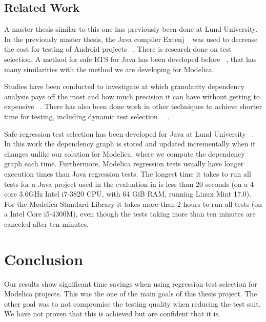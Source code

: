 \documentclass{cslthse-msc}
\begin{document}
\section{Related Work}
A master thesis similar to this one has previously been done at Lund University. In the previously master thesis, the Java compiler Extenj ~\cite{DBLP:conf/oopsla/EkmanH07} was used to decrease the cost for testing of Android projects ~\cite{kampe2012dependroid}. There is research done on test selection. A method for safe RTS for Java has been developed before ~\cite{DBLP:conf/pppj/OqvistHM16}, that has many similarities with the method we are developing for Modelica. 

Studies have been conducted to investigate at which granularity dependency analysis pays off the most and how much precision it can have without getting to expensive ~\cite{DBLP:conf/sigsoft/LegunsenHSLZM16}. There has also been done work in other techniques to achieve shorter time for testing, including dynamic test selection ~\cite{DBLP:journals/tse/RothermelH96}~\cite{DBLP:conf/issta/GligoricEM15}.

Safe regression test selection has been developed for Java at Lund University ~\cite{DBLP:conf/pppj/OqvistHM16}. In this work the dependency graph is stored and updated incrementally when it changes unlike our solution for Modelica, where we compute the dependency graph each time. Furthermore, Modelica regression tests usually have longer execution times than Java regression tests. The longest time it takes to run all tests for a Java project used in the evaluation in \cite{DBLP:conf/pppj/OqvistHM16} is less than 20 seconds (on a 4-core 3.6GHz Intel i7-3820 CPU, with 64 GiB RAM, running Linux Mint 17.0). For the Modelica Standard Library it takes more than 2 hours to run all tests (on a Intel Core i5-4300M), even though the tests taking more than ten minutes are canceled after ten minutes.

\chapter[Conclusion]{Conclusion}
Our results show significant time savings when using regression test selection for Modelica projects. This was the one of the main goals of this thesis project. The other goal was to not compromise the testing quality when reducing the test suit. We have not proven that this is achieved but are confident that it is. 
\end{document}
